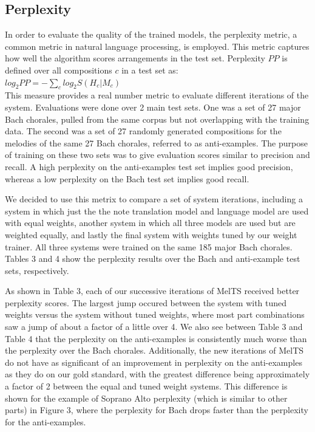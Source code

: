 \documentclass{sig-alternate}
\begin{document}
\subsection{Perplexity}
In order to evaluate the quality of the trained models, the perplexity metric, a common metric in natural language processing, is employed. This metric captures how well the algorithm scores arrangements in the test set. Perplexity $PP$ \cite{Koehn:2010:SMT:1734086} is defined over all compositions $c$ in a test set as:\\

$log_2 PP = - \sum_{c} log_2 S(H_{c} | M_{c})$\\

This measure provides a real number metric to evaluate different iterations of the system. Evaluations were done over 2 main test sets. One was a set of 27 major Bach chorales, pulled from the same corpus but not overlapping with the training data. The second was a set of 27 randomly generated compositions for the melodies of the same 27 Bach chorales, referred to as anti-examples. The purpose of training on these two sets was to give evaluation scores similar to precision and recall. A high perplexity on the anti-examples test set implies good precision, whereas a low perplexity on the Bach test set implies good recall. 	

We decided to use this metrix to compare a set of system iterations, including a system in which just the the note translation model and language model are used with equal weights, another system in which all three models are used but are weighted equally, and lastly the final system with weights tuned by our weight trainer. All three systems were trained on the same 185 major Bach chorales. Tables 3 and 4 show the perplexity results over the Bach and anti-example test sets, respectively. 

As shown in Table 3, each of our successive iterations of MelTS received better perplexity scores. The largest jump occured between the system with tuned
weights versus the system without tuned weights, where most part combinations saw a jump of about a factor of a little over 4. We also see between Table 3 and Table 4 that the perplexity on the anti-examples is consistently much worse than the perplexity over the Bach chorales. Additionally, the new iterations of MelTS do not have as significant of an improvement in perplexity on the anti-examples as they do on our gold standard, with the greatest difference being approximately a factor of 2 between the equal and tuned weight systems. This difference is shown for the example of Soprano Alto perplexity (which is similar to other parts) in Figure 3, where the perplexity for Bach drops faster than the perplexity for the anti-examples.
\end{document}
